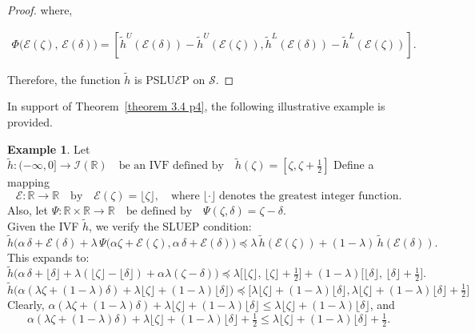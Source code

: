 \documentclass[12pt, reqno]{amsart}
\theoremstyle{definition}
\newtheorem{example}{Example}[section]
\theoremstyle{remark}
\numberwithin{equation}{section}
\begin{document}
\begin{proof}
    \noindent
    where, 
    
    \begin{equation*}
\begin{aligned}
\mathfrak{\Phi}\big({\mathcal{E}}(\zeta),\,{\mathcal{E}}(\delta)\big) 
= [\tilde{h}^U({\mathcal{E}} (\mathit{\delta} ))-\tilde{h}^U({\mathcal{E}}(\mathit{\zeta} )),\tilde{h}^L({\mathcal{E}} (\mathit{\delta} ))-\tilde{h}^L({\mathcal{E}}(\mathit{\zeta} ))].
\end{aligned}
\end{equation*}

Therefore, the function $\tilde{h}$ is PSLU$\mathcal{E}$P on ${\mathcal{S}}$.
    \end{proof}
In support of Theorem~\ref{theorem 3.4 p4}, the following illustrative example is provided.

\begin{example}\label{example3.3}
Let $\tilde{h} : (-\infty, 0] \to \mathcal{I}(\mathbb{R})
\quad \text{be an IVF defined by} \quad
\tilde{h}(\zeta) = [\zeta, \zeta + \frac{1}{2}]$ Define a mapping
\[
\mathcal{E} : \mathbb{R} \to \mathbb{R} 
\quad \text{by} \quad 
\mathcal{E}(\zeta) = \lfloor \zeta \rfloor,
\quad \text{where} \; \lfloor \cdot \rfloor \; \text{denotes the greatest integer function.}
\]
Also, let $\Psi : \mathbb{R} \times \mathbb{R} \to \mathbb{R} 
\quad \text{be defined by} \quad 
\Psi(\zeta, \delta) = \zeta - \delta.$\\
Given the IVF $\tilde{h}$, we verify the SLUEP condition:
\[
\tilde{h}\big(\alpha\, \delta + \mathcal{E}(\delta) + \lambda\, \Psi(\alpha\zeta+\mathcal{E}(\zeta), \alpha\, \delta + \mathcal{E}(\delta) \big) 
\preceq \lambda\, \tilde{h}(\mathcal{E}(\zeta)) + (1-\lambda)\, \tilde{h}(\mathcal{E}(\delta)).
\]
This expands to:
\[
\tilde{h}\big(\alpha\, \delta + \lfloor \delta \rfloor + \lambda(\lfloor \zeta \rfloor - \lfloor \delta \rfloor)+\alpha \lambda(\zeta-\delta)\big)
\preceq \lambda\big[\lfloor \zeta \rfloor,\, \lfloor \zeta \rfloor + \tfrac{1}{2} \big]  + (1-\lambda) \big[\lfloor \delta \rfloor,\, \lfloor \delta \rfloor + \tfrac{1}{2}\big].
\]
\[
\tilde{h}\big(\alpha(\lambda \zeta+(1-\lambda)\delta)+\lambda \lfloor \zeta \rfloor+(1-\lambda)\lfloor \delta \rfloor)\preceq \big[\lambda \lfloor \zeta \rfloor+(1-\lambda)\lfloor \delta \rfloor,\lambda \lfloor \zeta \rfloor+(1-\lambda)\lfloor \delta \rfloor+\tfrac{1}{2} \big]
\]
Clearly,
$\alpha(\lambda \zeta+(1-\lambda)\delta)+\lambda \lfloor \zeta \rfloor+(1-\lambda)\lfloor \delta \rfloor 
\leq \lambda \lfloor \zeta \rfloor+(1-\lambda)\lfloor \delta \rfloor$,
and 
\[
\alpha(\lambda \zeta+(1-\lambda)\delta)+\lambda \lfloor \zeta \rfloor+(1-\lambda)\lfloor \delta \rfloor +\tfrac{1}{2}
\leq \lambda \lfloor \zeta \rfloor+(1-\lambda)\lfloor \delta \rfloor+\tfrac{1}{2}.
\]


\end{example}
\end{document}
